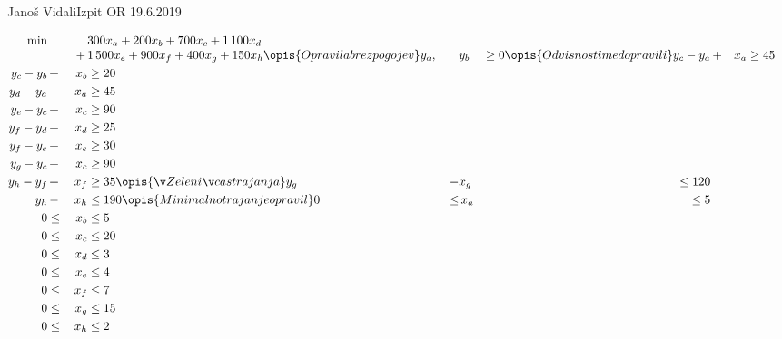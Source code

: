 \begin{naloga}{Janoš Vidali}{Izpit OR 19.6.2019}
\begin{odgovor}
\begin{enumerate}[(a)]
\begin{alignat*}{2}
\min &&&{} 300 x_a + 200 x_b + 700 x_c + 1\,100 x_d \\[-1mm]
&&+\,&{} 1\,500 x_e + 900 x_f + 400 x_g + 150 x_h
\opis{Opravila brez pogojev}
y_a, &&{} y_b &\ge 0
\opis{Odvisnosti med opravili}
y_c - y_a &\,+& x_a &\ge 45 \\
y_c - y_b &\,+& x_b &\ge 20 \\
y_d - y_a &\,+& x_a &\ge 45 \\
y_e - y_c &\,+& x_c &\ge 90 \\
y_f - y_d &\,+& x_d &\ge 25 \\
y_f - y_e &\,+& x_e &\ge 30 \\
y_g - y_c &\,+& x_c &\ge 90 \\
y_h - y_f &\,+& x_f &\ge 35
\opis{Želeni čas trajanja}
y_g &\,-& x_g &\le 120 \\
y_h &\,-& x_h &\le 190
\opis{Minimalno trajanje opravil}
0 &\le&\, x_a &\le 5 \\
0 &\le&\, x_b &\le 5 \\
0 &\le&\, x_c &\le 20 \\
0 &\le&\, x_d &\le 3 \\
0 &\le&\, x_e &\le 4 \\
0 &\le&\, x_f &\le 7 \\
0 &\le&\, x_g &\le 15 \\
0 &\le&\, x_h &\le 2
\end{alignat*}
\end{enumerate}
%
\begin{slika}
\pgfslika
{}
\end{slika}
%
\begin{tabela}
\end{tabela}
\end{odgovor}
\end{naloga}
